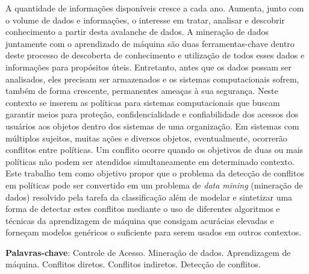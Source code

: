 \documentclass[
	12pt,				%
	openright,			%
	twoside,			%
	a4paper,			%
	english,			%
	french,				%
	spanish,			%
	brazil				%
	]{abntex2}
\begin{document}
\setlength{\absparsep}{18pt} %
\begin{resumo}
A quantidade de informações disponíveis cresce a cada ano. Aumenta, junto com o volume de dados e informações, o interesse em tratar, analisar e descobrir conhecimento a partir desta avalanche de dados. A mineração de dados juntamente com o aprendizado de máquina são duas ferramentas-chave dentro deste processo de descoberta de conhecimento e utilização de todos esses dados e informações para propósitos úteis. Entretanto, antes que os dados possam ser analisados, eles precisam ser armazenados e os sistemas computacionais sofrem, também de forma crescente, permanentes ameaças à sua segurança. Neste contexto se inserem as políticas para sistemas computacionais que buscam garantir meios para proteção, confidencialidade e confiabilidade dos acessos dos usuários aos objetos dentro dos sistemas de uma organização. Em sistemas com múltiplos sujeitos, muitas ações e diversos objetos, eventualmente, ocorrerão conflitos entre políticas. Um conflito ocorre quando os objetivos de duas ou mais políticas não podem ser atendidos simultaneamente em determinado contexto. Este trabalho tem como objetivo propor que o problema da detecção de conflitos em políticas pode ser convertido em um problema de \textit{data mining} (mineração de dados) resolvido pela tarefa da classificação além de modelar e sintetizar uma forma de detectar estes conflitos mediante o uso de diferentes algoritmos e técnicas da aprendizagem de máquina que consigam acurácias elevadas e forneçam modelos genéricos o suficiente para serem usados em outros contextos.

 \textbf{Palavras-chave}: Controle de Acesso. Mineração de dados. Aprendizagem de máquina. Conflitos diretos. Conflitos indiretos. Detecção de conflitos.
\end{resumo}
\end{document}
